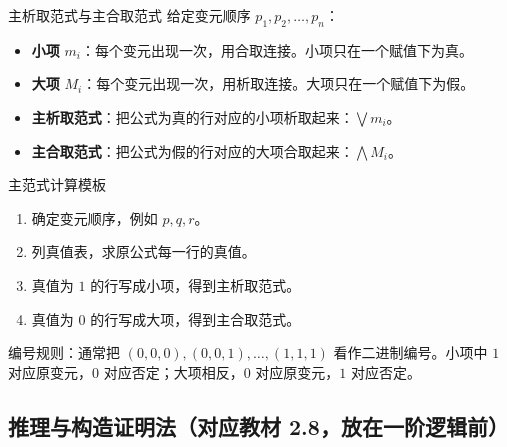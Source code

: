 \documentclass[UTF8,zihao=-4]{ctexart}
\newcommand{\kw}[1]{\textbf{\color{main}#1}}
\begin{document}
\begin{corebox}{主析取范式与主合取范式}
给定变元顺序 $p_1,p_2,\ldots,p_n$：
\begin{itemize}
  \item \kw{小项} $m_i$：每个变元出现一次，用合取连接。小项只在一个赋值下为真。
  \item \kw{大项} $M_i$：每个变元出现一次，用析取连接。大项只在一个赋值下为假。
  \item \kw{主析取范式}：把公式为真的行对应的小项析取起来：$\bigvee m_i$。
  \item \kw{主合取范式}：把公式为假的行对应的大项合取起来：$\bigwedge M_i$。
\end{itemize}
\end{corebox}

\begin{methodbox}{主范式计算模板}
\begin{enumerate}
  \item 确定变元顺序，例如 $p,q,r$。
  \item 列真值表，求原公式每一行的真值。
  \item 真值为 $1$ 的行写成小项，得到主析取范式。
  \item 真值为 $0$ 的行写成大项，得到主合取范式。
\end{enumerate}
编号规则：通常把 $(0,0,0),(0,0,1),\ldots,(1,1,1)$ 看作二进制编号。小项中 $1$ 对应原变元，$0$ 对应否定；大项相反，$0$ 对应原变元，$1$ 对应否定。
\end{methodbox}

\subsection{推理与构造证明法（对应教材 2.8，放在一阶逻辑前）}
\end{document}
